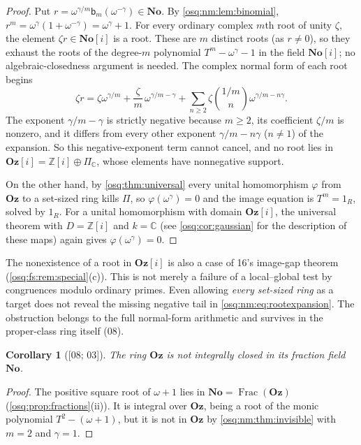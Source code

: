 \documentclass[11pt,letterpaper]{article}
\numberwithin{equation}{section}
\newtheorem{corollary}[corollary]{Corollary}
\theoremstyle{definition}
\theoremstyle{remark}
\theoremstyle{plain}
\newcommand{\No}{\mathbf{No}}
\newcommand{\Oz}{\mathbf{Oz}}
\newcommand{\SC}{\No[i]}
\newcommand{\GOz}{\Oz[i]}
\newcommand{\Z}{\mathbb Z}
\newcommand{\C}{\mathbb C}
\newcommand{\Frac}{\operatorname{Frac}}
\newcommand{\src}[1]{\textup{\textsf{[#1]}}}
\begin{document}
\begin{proof}
Put $r=\omega^{\gamma/m}\mathsf b_m(\omega^{-\gamma})\in\No$. By
\cref{osq:nm:lem:binomial}, $r^m=\omega^\gamma(1+\omega^{-\gamma})=\omega^\gamma+1$. For
every ordinary complex $m$th root of unity $\zeta$, the element $\zeta r\in\SC$ is a
root. These are $m$ distinct roots (as $r\ne0$), so they exhaust the roots of the
degree-$m$ polynomial $T^m-\omega^\gamma-1$ in the field $\SC$; no algebraic-closedness
argument is needed. The complex normal form of each root begins
\begin{equation}\label{osq:nm:eq:rootexpansion}
 \zeta r=\zeta\omega^{\gamma/m}+\frac{\zeta}{m}\,\omega^{\gamma/m-\gamma}
 +\sum_{n\ge2}\zeta\binom{1/m}{n}\omega^{\gamma/m-n\gamma}.
\end{equation}
The exponent $\gamma/m-\gamma$ is strictly negative because $m\ge2$, its coefficient
$\zeta/m$ is nonzero, and it differs from every other exponent $\gamma/m-n\gamma$
($n\ne1$) of the expansion. So this negative-exponent term cannot cancel, and no root lies
in $\GOz=\Z[i]\oplus\Pi_\C$, whose elements have nonnegative support.

On the other hand, by \cref{osq:thm:universal} every unital homomorphism $\varphi$ from
$\Oz$ to a set-sized ring kills $\Pi$, so $\varphi(\omega^\gamma)=0$ and the image equation
is $T^m=1_R$, solved by $1_R$. For a unital homomorphism with domain $\GOz$, the universal
theorem with $D=\Z[i]$ and $k=\C$ (see \cref{osq:cor:gaussian} for the description of these
maps) again gives $\varphi(\omega^\gamma)=0$.
\end{proof}

The nonexistence of a root in $\GOz$ is also a case of 16's image-gap theorem
(\cref{osq:fs:rem:special}(c)). This is not merely a failure of a local--global test by congruences
modulo ordinary primes.
Even allowing \emph{every set-sized ring} as a target does not reveal the missing negative
tail in \eqref{osq:nm:eq:rootexpansion}. The obstruction belongs to the full normal-form
arithmetic and survives in the proper-class ring itself (08).

\begin{corollary}[\src{08; 03}]\label{osq:nm:cor:notintclosed}
The ring $\Oz$ is not integrally closed in its fraction field $\No$.
\end{corollary}

\begin{proof}
The positive square root of $\omega+1$ lies in $\No=\Frac(\Oz)$
(\cref{osq:prop:fractions}(ii)). It is integral over $\Oz$, being a root of the monic
polynomial $T^2-(\omega+1)$, but it is not in $\Oz$ by \cref{osq:nm:thm:invisible} with
$m=2$ and $\gamma=1$.
\end{proof}
\end{document}
